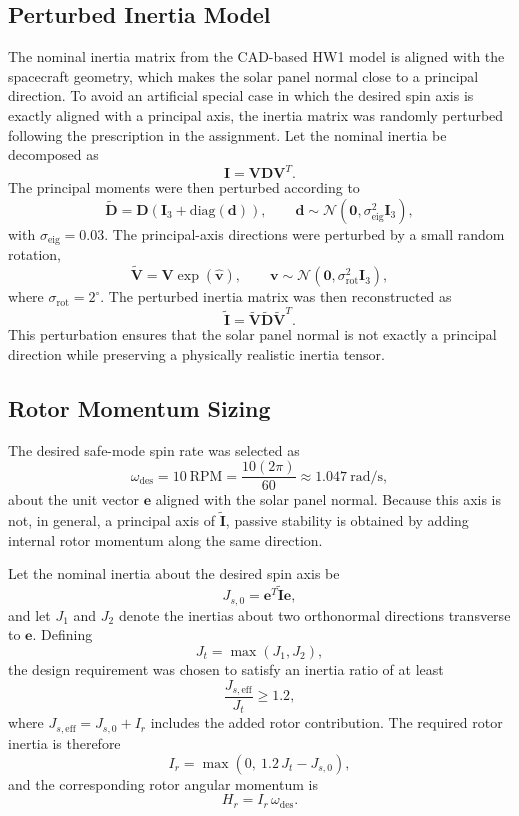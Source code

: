 \documentclass[12pt]{article}
\begin{document}
\subsection{Perturbed Inertia Model}

The nominal inertia matrix from the CAD-based HW1 model is aligned with the
spacecraft geometry, which makes the solar panel normal close to a principal
direction. To avoid an artificial special case in which the desired spin axis is exactly
aligned with a principal axis, the inertia matrix was randomly perturbed following the
prescription in the assignment. Let the nominal inertia be decomposed as
\[
\mathbf{I} = \mathbf{V}\mathbf{D}\mathbf{V}^T.
\]
The principal moments were then perturbed according to
\[
\widetilde{\mathbf{D}}
=
\mathbf{D}\left(\mathbf{I}_3 + \mathrm{diag}(\mathbf{d})\right),
\qquad
\mathbf{d} \sim \mathcal{N}\!\left(\mathbf{0}, \sigma_{\mathrm{eig}}^2 \mathbf{I}_3\right),
\]
with $\sigma_{\mathrm{eig}} = 0.03$. The principal-axis directions were perturbed by a
small random rotation,
\[
\widetilde{\mathbf{V}}
=
\mathbf{V}\exp(\widehat{\mathbf{v}}),
\qquad
\mathbf{v} \sim \mathcal{N}\!\left(\mathbf{0}, \sigma_{\mathrm{rot}}^2 \mathbf{I}_3\right),
\]
where $\sigma_{\mathrm{rot}} = 2^\circ$. The perturbed inertia matrix was then reconstructed as
\[
\widetilde{\mathbf{I}}
=
\widetilde{\mathbf{V}}\widetilde{\mathbf{D}}\widetilde{\mathbf{V}}^T.
\]
This perturbation ensures that the solar panel normal is not exactly a principal
direction while preserving a physically realistic inertia tensor.

\subsection{Rotor Momentum Sizing}

The desired safe-mode spin rate was selected as
\[
\omega_{\mathrm{des}} = 10 \ \mathrm{RPM}
= \frac{10(2\pi)}{60}
\approx 1.047 \ \mathrm{rad/s},
\]
about the unit vector $\mathbf{e}$ aligned with the solar panel normal. Because this
axis is not, in general, a principal axis of $\widetilde{\mathbf{I}}$, passive stability is
obtained by adding internal rotor momentum along the same direction.

Let the nominal inertia about the desired spin axis be
\[
J_{s,0} = \mathbf{e}^T \widetilde{\mathbf{I}} \mathbf{e},
\]
and let $J_1$ and $J_2$ denote the inertias about two orthonormal directions
transverse to $\mathbf{e}$. Defining
\[
J_t = \max(J_1, J_2),
\]
the design requirement was chosen to satisfy an inertia ratio of at least
\[
\frac{J_{s,\mathrm{eff}}}{J_t} \geq 1.2,
\]
where $J_{s,\mathrm{eff}} = J_{s,0} + I_r$ includes the added rotor contribution. The
required rotor inertia is therefore
\[
I_r = \max\left(0,\ 1.2\,J_t - J_{s,0}\right),
\]
and the corresponding rotor angular momentum is
\[
H_r = I_r \, \omega_{\mathrm{des}}.
\]
\end{document}
